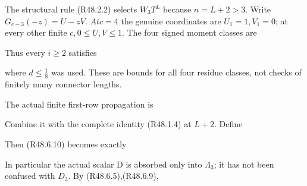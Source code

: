 The structural rule (R48.2.2) selects \(W_{3} T^L\) because \(n=L+2>3\). Write \(G_{c-3}(-z)=U-zV\). \(At c=4\) the genuine coordinates are \(U_{1}=1,\allowbreak \allowbreak V_{1}=0\); at every other finite \(c,\allowbreak \allowbreak  0\le U,\allowbreak \allowbreak V\le 1\). The four signed moment classes are


Thus every \(i\ge 2\) satisfies


where \(d\le \frac{1}{8}\) was used. These are bounds for all four residue classes, not checks of finitely many connector lengths.

The actual finite first-row propagation is


Combine it with the complete identity (R48.1.4) at \(L+2\). Define


Then (R48.6.10) becomes exactly


In particular the actual scalar D is absorbed only into \(\Lambda_{3}\); it has not been confused with \(D_3\). By (R48.6.5),(R48.6.9),


